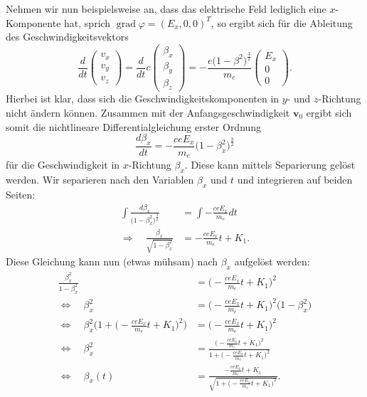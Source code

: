 Nehmen wir nun beispielsweise an,
dass das elektrische Feld lediglich eine \(x\)-Komponente hat,
sprich \( \operatorname{grad} \varphi = (E_x, 0, 0)^T \),
so ergibt sich für die Ableitung des Geschwindigkeitsvektors
\begin{equation}
    \frac{d}{dt}
    \begin{pmatrix}
        v_x \\
        v_y \\
        v_z
    \end{pmatrix} =
    \frac{d}{dt} c
    \begin{pmatrix}
        \beta_x \\
        \beta_y \\
        \beta_z
    \end{pmatrix} =
    - \frac{e \bigl(1-\beta^2\bigr)^\frac{3}{2}}{m_e}
    \begin{pmatrix}
        E_x \\
        0 \\
        0
    \end{pmatrix}.
    \label{relativ:eqn:bsp-abl-v-vec}
\end{equation}
Hierbei ist klar, dass sich die Geschwindigkeitskomponenten
in \(y\)- und \(z\)-Richtung nicht ändern können.
Zusammen mit der Anfangsgeschwindigkeit \(\bm{v}_0\)
ergibt sich somit die nichtlineare Differentialgleichung erster Ordnung
\begin{equation}
    \frac{d\beta_x}{dt} = - \frac{c e E_x}{m_e} \bigl(1-\beta_x^2\bigr)^\frac{3}{2}
\end{equation}
für die Geschwindigkeit in \(x\)-Richtung \(\beta_x\).
Diese kann mittels Separierung gelöst werden.
Wir separieren nach den Variablen \(\beta_x\) und \(t\)
und integrieren auf beiden Seiten:
\begin{align*}
    \int\frac{d\beta_x}{\bigl(1-\beta_x^2\bigr)^\frac{3}{2}}
    &= \int-\frac{c e E_x}{m_e}dt \\
    \Rightarrow\quad\frac{\beta_x}{\sqrt{1-\beta_x^2}}
    &= -\frac{c e E_x}{m_e}t + K_1.
\end{align*}
Diese Gleichung kann nun (etwas mühsam) nach \(\beta_x\) aufgelöst werden:
\begin{align*}
    \frac{\beta_x^2}{1-\beta_x^2}
    &= \biggl(-\frac{c e E_x}{m_e}t + K_1\biggr)^2\\
    \Leftrightarrow\quad \beta_x^2 &= \biggl(-\frac{c e E_x}{m_e}t + K_1\biggr)^2
    \biggl(1-\beta_x^2\biggr)\\
    \Leftrightarrow\quad
    \beta_x^2 \biggl(1 + \biggl(-\frac{c e E_x}{m_e}t + K_1\biggr)^2\biggr)
    &= \biggl(-\frac{c e E_x}{m_e}t + K_1\biggr)^2\\
    \Leftrightarrow\quad
    \beta_x^2 &= \frac{\biggl(-\frac{c e E_x}{m_e}t + K_1\biggr)^2}
    {1 + \biggl(-\frac{c e E_x}{m_e}t + K_1\biggr)^2}\\
    \Leftrightarrow\quad
    \beta_x(t) &= \frac{-\frac{c e E_x}{m_e}t + K_1}
    {\sqrt{1+\biggl(-\frac{ceE_x}{m_e}t+K_1\biggr)^2}}.
\end{align*}

